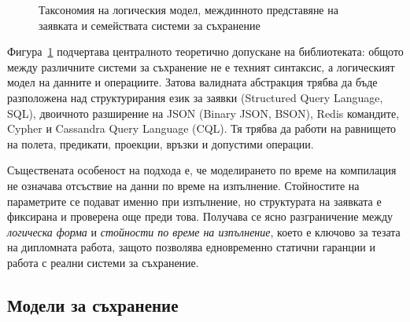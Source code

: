 \begin{figure}[H]
\centering
{}
\caption{Таксономия на логическия модел, междинното представяне на заявката и семействата системи за съхранение}
\label{fig:storage_taxonomy}
\end{figure}

Фигура~\ref{fig:storage_taxonomy} подчертава централното теоретично допускане на библиотеката: общото между различните системи за съхранение не е техният синтаксис, а логическият модел на данните и операциите. Затова валидната абстракция трябва да бъде разположена над структурирания език за заявки (Structured Query Language, SQL), двоичното разширение на JSON (Binary JSON, BSON), Redis командите, Cypher и Cassandra Query Language (CQL). Тя трябва да работи на равнището на полета, предикати, проекции, връзки и допустими операции.

Съществената особеност на подхода е, че моделирането по време на компилация не означава отсъствие на данни по време на изпълнение. Стойностите на параметрите се подават именно при изпълнение, но структурата на заявката е фиксирана и проверена още преди това. Получава се ясно разграничение между \emph{логическа форма} и \emph{стойности по време на изпълнение}, което е ключово за тезата на дипломната работа, защото позволява едновременно статични гаранции и работа с реални системи за съхранение.

\subsection{Модели за съхранение}

